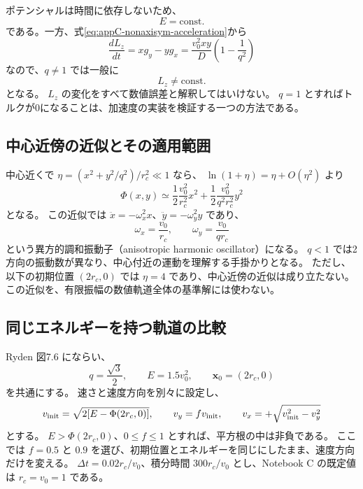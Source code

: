 ポテンシャルは時間に依存しないため、
\begin{equation}
 E=\mathrm{const.}
\label{eq:appC-nonaxisym-energy}
\end{equation}
である。一方、式\eqref{eq:appC-nonaxisym-acceleration}から
\begin{equation}
 \frac{dL_z}{dt}=xg_y-yg_x
 =\frac{v_0^2xy}{D}\left(1-\frac1{q^2}\right)
\label{eq:appC-nonaxisym-torque}
\end{equation}
なので、$q\ne1$ では一般に
\begin{equation}
 L_z\ne\mathrm{const.}
\label{eq:appC-nonaxisym-lz}
\end{equation}
となる。
$L_z$ の変化をすべて数値誤差と解釈してはいけない。
$q=1$ とすればトルクが0になることは、加速度の実装を検証する一つの方法である。

\subsection{中心近傍の近似とその適用範囲}

中心近くで $\eta=(x^2+y^2/q^2)/r_c^2\ll1$ なら、
$\ln(1+\eta)=\eta+O(\eta^2)$ より
\begin{equation}
 \Phi(x,y)\simeq\frac12\frac{v_0^2}{r_c^2}x^2
 +\frac12\frac{v_0^2}{q^2r_c^2}y^2
\label{eq:appC-anisotropic-harmonic}
\end{equation}
となる。
この近似では $\ddot x=-\omega_x^2x$、$\ddot y=-\omega_y^2y$ であり、
\begin{equation}
 \omega_x=\frac{v_0}{r_c},\qquad \omega_y=\frac{v_0}{qr_c}
\end{equation}
という異方的調和振動子（anisotropic harmonic oscillator）になる。
$q<1$ では2方向の振動数が異なり、中心付近の運動を理解する手掛かりとなる。
ただし、以下の初期位置 $(2r_c,0)$ では $\eta=4$ であり、中心近傍の近似は成り立たない。
この近似を、有限振幅の数値軌道全体の基準解には使わない。

\subsection{同じエネルギーを持つ軌道の比較}

Ryden 図7.6 にならい、
\begin{equation}
 q=\frac{\sqrt3}{2},\qquad E=1.5v_0^2,\qquad
 \boldsymbol x_0=(2r_c,0)
\label{eq:appC-nonaxisym-params}
\end{equation}
を共通にする。
速さと速度方向を別々に設定し、
\begin{equation}
 v_{\rm init}=\sqrt{2[E-\Phi(2r_c,0)]},\qquad
 v_y=fv_{\rm init},\qquad
 v_x=+\sqrt{v_{\rm init}^2-v_y^2}
\label{eq:appC-nonaxisym-initial}
\end{equation}
とする。
$E>\Phi(2r_c,0)$、$0\le f\le1$ とすれば、平方根の中は非負である。
ここでは $f=0.5$ と $0.9$ を選び、初期位置とエネルギーを同じにしたまま、速度方向だけを変える。
$\Delta t=0.02r_c/v_0$、積分時間 $300r_c/v_0$ とし、Notebook C の既定値は $r_c=v_0=1$ である。

